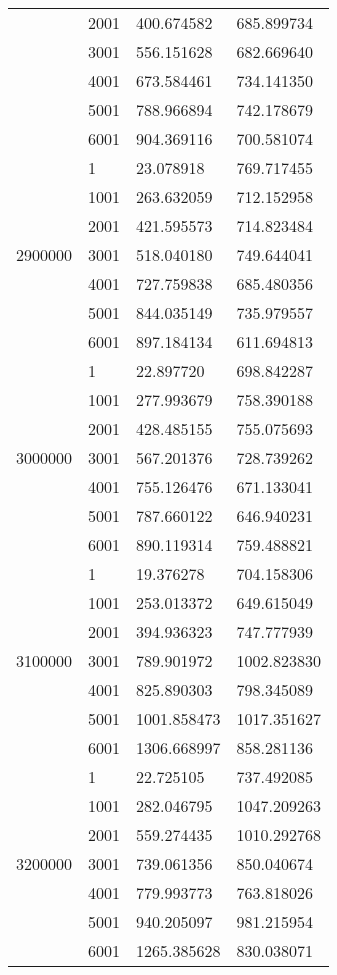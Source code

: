 \begin{table}[htb!]
\begin{tabular}{llll}
 & 2001 & 400.674582 & 685.899734 \\
 & 3001 & 556.151628 & 682.669640 \\
 & 4001 & 673.584461 & 734.141350 \\
 & 5001 & 788.966894 & 742.178679 \\
 & 6001 & 904.369116 & 700.581074 \\
\multirow[c]{7}{*}{2900000} & 1 & 23.078918 & 769.717455 \\
 & 1001 & 263.632059 & 712.152958 \\
 & 2001 & 421.595573 & 714.823484 \\
 & 3001 & 518.040180 & 749.644041 \\
 & 4001 & 727.759838 & 685.480356 \\
 & 5001 & 844.035149 & 735.979557 \\
 & 6001 & 897.184134 & 611.694813 \\
\multirow[c]{7}{*}{3000000} & 1 & 22.897720 & 698.842287 \\
 & 1001 & 277.993679 & 758.390188 \\
 & 2001 & 428.485155 & 755.075693 \\
 & 3001 & 567.201376 & 728.739262 \\
 & 4001 & 755.126476 & 671.133041 \\
 & 5001 & 787.660122 & 646.940231 \\
 & 6001 & 890.119314 & 759.488821 \\
\multirow[c]{7}{*}{3100000} & 1 & 19.376278 & 704.158306 \\
 & 1001 & 253.013372 & 649.615049 \\
 & 2001 & 394.936323 & 747.777939 \\
 & 3001 & 789.901972 & 1002.823830 \\
 & 4001 & 825.890303 & 798.345089 \\
 & 5001 & 1001.858473 & 1017.351627 \\
 & 6001 & 1306.668997 & 858.281136 \\
\multirow[c]{7}{*}{3200000} & 1 & 22.725105 & 737.492085 \\
 & 1001 & 282.046795 & 1047.209263 \\
 & 2001 & 559.274435 & 1010.292768 \\
 & 3001 & 739.061356 & 850.040674 \\
 & 4001 & 779.993773 & 763.818026 \\
 & 5001 & 940.205097 & 981.215954 \\
 & 6001 & 1265.385628 & 830.038071 \\

\end{tabular}
\end{table}
